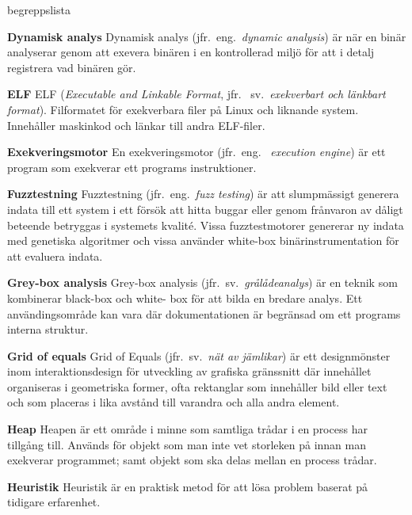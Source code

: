 \begin{labeling}{begreppslista}
    \item [\textbf{Dynamisk analys}] Dynamisk analys (jfr.\ eng.\ \emph{dynamic
        analysis}) är när en binär analyserar genom att exevera binären i en
    kontrollerad miljö för att i detalj registrera vad binären gör.

    \item [\textbf{ELF}] ELF (\emph{Executable and Linkable Format}, jfr. \ sv.\
    \emph{exekverbart och länkbart format}). Filformatet för exekverbara filer
    på Linux och liknande system. Innehåller maskinkod och länkar till andra
    ELF-filer.

    \item [\textbf{Exekveringsmotor}] En exekveringsmotor (jfr.\ eng.
    \ \emph{execution engine}) är ett program som exekverar ett programs
    instruktioner.

    \item [\textbf{Fuzztestning}] Fuzztestning (jfr.\ eng.\ \emph{fuzz testing})
    är att slumpmässigt generera indata till ett system i ett försök att hitta
    buggar eller genom frånvaron av dåligt beteende betryggas i systemets
    kvalité. Vissa fuzztestmotorer genererar ny indata med genetiska algoritmer
    och vissa använder white-box binärinstrumentation för att evaluera indata.

    \item [\textbf{Grey-box analysis}] Grey-box analysis (jfr.\ sv.\
    \emph{grålådeanalys}) är en teknik som kombinerar black-box och white-
    box för att bilda en bredare analys. Ett användingsområde kan vara där
    dokumentationen är begränsad om ett programs interna struktur.

    \item [\textbf{Grid of equals}] Grid of Equals (jfr.\ sv.\ \emph{nät av
        jämlikar}) är ett designmönster inom interaktionsdesign för utveckling av
    grafiska gränssnitt där innehållet organiseras i geometriska former, ofta
    rektanglar som innehåller bild eller text och som placeras i lika avstånd
    till varandra och alla andra element.

    \item [\textbf{Heap}] Heapen är ett område i minne som samtliga trådar i
    en process har tillgång till. Används för objekt som man inte vet storleken på
    innan man exekverar programmet; samt objekt som ska delas mellan en process
    trådar.

    \item [\textbf{Heuristik}] Heuristik är en praktisk metod för att lösa
    problem baserat på tidigare erfarenhet.


\end{labeling}
